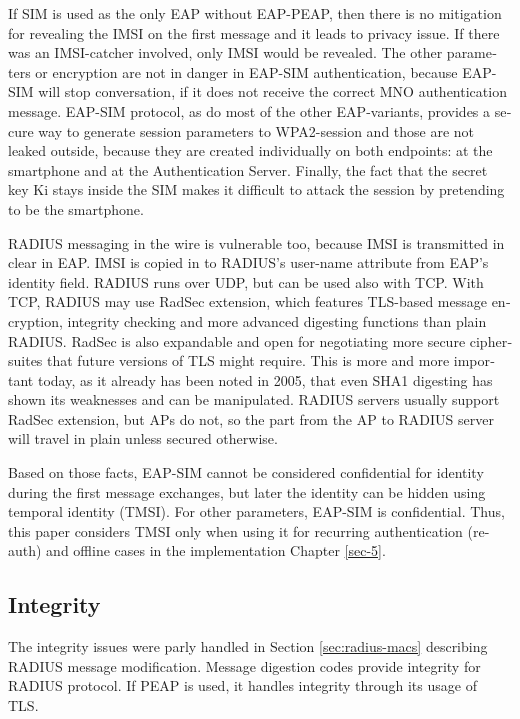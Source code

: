 \documentclass[12pt,a4paper,english]{tutthesis}
\begin{document}
\begin{otherlanguage}{english}
If SIM is used as the only EAP without EAP-PEAP, then there is no
mitigation for revealing the IMSI on the first message and it leads to
privacy issue.  If there was an IMSI-catcher involved, only IMSI would
be revealed.  The other parameters or encryption are not in danger in
EAP-SIM authentication, because EAP-SIM will stop conversation, if it
does not receive the correct MNO authentication message.  EAP-SIM
protocol, as do most of the other EAP-variants, provides a secure way
to generate session parameters to WPA2-session and those are not
leaked outside, because they are created individually on both
endpoints: at the smartphone and at the Authentication Server.
Finally, the fact that the secret key Ki stays inside the SIM makes it
difficult to attack the session by pretending to be the smartphone.






RADIUS messaging in the wire is vulnerable too, because IMSI is transmitted in clear 
in EAP. IMSI is copied in to RADIUS's user-name attribute from EAP's identity field.
RADIUS runs over UDP, but can be used also with TCP. With TCP, RADIUS
may use RadSec extension, which features TLS-based message encryption,
integrity checking and more advanced digesting functions than plain
RADIUS.
RadSec is also expandable and open 
for negotiating more secure ciphersuites that future 
versions of TLS might require\cite{rfc6614}. This is
more and more important today, as it already has been noted in 2005,
that even SHA1 digesting has shown its weaknesses and can be manipulated.
RADIUS servers usually support RadSec extension, but APs do not, so 
the part from the AP to RADIUS server will travel in plain unless
secured otherwise.


Based on those facts, EAP-SIM cannot be considered confidential for identity
during the first message exchanges, but later the identity can be hidden
using temporal identity (TMSI). 
For other parameters, EAP-SIM is confidential.
Thus, this paper considers TMSI only when using it for recurring
authentication (re-auth) and offline cases in the implementation Chapter
\ref{sec-5}.
\subsection{Integrity}
\label{sec-6-1-2}



The integrity issues were parly handled in Section \ref{sec:radius-macs} describing
RADIUS message modification.
Message digestion codes provide integrity for RADIUS protocol.
If PEAP is used, it handles integrity through its usage of
 TLS\cite{peap}.


\end{otherlanguage}
\end{document}
